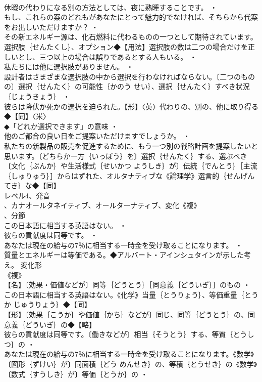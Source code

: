 \documentclass[8pt]{extreport}
\begin{document}
\begin{CJK}{UTF8}{min}
\\	休暇の代わりになる別の方法としては、夜に熟睡することです。 ・
\\	もし、これらの案のどれもがあなたにとって魅力的でなければ、そちらから代案をお出しいただけますか？ ・
\\	その新エネルギー源は、化石燃料に代わるものの一つとして期待されています。選択肢｛せんたくし｝、オプション◆【用法】選択肢の数は二つの場合だけを正しいとし、三つ以上の場合は誤りであるとする人もいる。 ・
\\	私たちには他に選択肢がありません。 ・
\\	設計者はさまざまな選択肢の中から選択を行わなければならない。〔二つのものの〕選択｛せんたく｝の可能性｛かのう せい｝、選択｛せんたく｝すべき状況｛じょうきょう｝ ・
\\	彼らは降伏か死かの選択を迫られた。【形】〈英〉代わりの、別の、他に取り得る◆【同】〈米〉
\\	◆「どれか選択できます」の意味 ・
\\	他のご都合の良い日をご提案いただけますでしょうか。 ・
\\	私たちの新製品の販売を促進するために、もう一つ別の戦略計画を提案したいと思います。〔どちらか一方｛いっぽう｝を〕選択｛せんたく｝する、選ぶべき〔文化｛ぶんか｝や生活様式｛せいかつ ようしき｝が〕伝統｛でんとう｝［主流｛しゅりゅう｝］からはずれた、オルタナティブな《論理学》選言的｛せんげん てき｝な◆【同】
\\	レベル4、発音
\\	、カナオールタネイティブ、オールターナティブ、変化《複》
\\	、分節
\\	この日本語に相当する英語はない。 ・
\\	彼らの貢献度は同等です。 ・
\\	あなたは現在の給与の7％に相当する一時金を受け取ることになります。 ・
\\	質量とエネルギーは等価である。◆アルバート・アインシュタインが示した考え。	変化形 
\\	《複》
\\	【名】〔効果・価値などが〕同等｛どうとう｝［同意義｛どういぎ｝］のもの ・
\\	この日本語に相当する英語はない。《化学》当量｛とうりょう｝、等価重量｛とうか じゅうりょう｝◆【同】
\\	【形】〔効果｛こうか｝や価値｛かち｝などが〕同じ、同等｛どうとう｝の、同意義｛どういぎ｝の◆【略】
\\	彼らの貢献度は同等です。〔働きなどが〕相当｛そうとう｝する、等質｛とうしつ｝の ・
\\	あなたは現在の給与の7％に相当する一時金を受け取ることになります。《数学》〔図形｛ずけい｝が〕同面積｛どう めんせき｝の、等積｛とうせき｝の《数学》〔数式｛すうしき｝が〕等価｛とうか｝の ・

\end{CJK}
\end{document}
